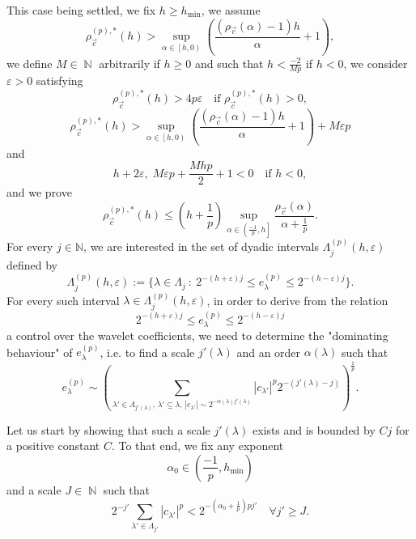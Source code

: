 \documentclass[a4paper,11pt,oneside]{article}
\DeclareMathOperator{\N}{\mathbb{N}}
\newcommand{\coint}[1]{\left[{#1}\right)}
\newcommand{\ooint}[1]{\left({#1}\right)}
\newcommand{\ocint}[1]{\left({#1}\right]}
\newcommand{\modu}[1]{\left\vert{#1}\right\vert}
\theoremstyle{definition}
\theoremstyle{plain}
\begin{document}
This case being settled, we fix $h\geq h_{\min}$, we assume 
\begin{equation}\label{eq:hyp}
    \rho^{(p),\ast}_{\vec{c}}(h)>\sup_{\alpha\in\coint{h,0}}\left(\frac{(\rho_{\vec{c}}(\alpha)-1)h}{\alpha}+1\right),
\end{equation}
we define $M\in\N$ arbitrarily if $h\geq 0$ and such that $h<\frac{-2}{Mp}$ if $h<0$,
we consider $\varepsilon>0$ satisfying
\begin{equation}\label{eq:epsilon}
    \rho_{\vec{c}}^{(p),\ast}(h)>4p\varepsilon \quad\text{if }\rho_{\vec{c}}^{(p),\ast}(h)>0,
\end{equation}
\begin{equation}\label{eq:epsilon_hyp}
    \rho^{(p),\ast}_{\vec{c}}(h)>\sup_{\alpha\in\coint{h,0}}\left(\frac{(\rho_{\vec{c}}(\alpha)-1)h}{\alpha}+1\right)+M\varepsilon p 
\end{equation}
and
\begin{equation}\label{eq:epsilon_neg}
    h+2\varepsilon ,\; M\varepsilon p +\frac{Mhp}{2}+1<0 \quad\text{if }h<0, 
\end{equation}
and we prove
\begin{equation}\label{eq:thesis_sup}
    \rho_{\vec{c}}^{(p),\ast}(h)\leq\left(h+\frac{1}{p}\right)\sup_{\alpha\in\ocint{\frac{-1}{p},h}}\frac{\rho_{\vec{c}}(\alpha)}{\alpha+\frac{1}{p}}.
\end{equation}
For every $j \in \mathbb{N}$, we are interested in the set of dyadic intervals 
\(\Lambda_j^{(p)}(h,\varepsilon)\) defined by
\[
\Lambda_j^{(p)}(h,\varepsilon) := \bigl\{ \lambda \in \Lambda_j \ : \ 2^{-(h+\varepsilon)j} \leq e_\lambda^{(p)} \leq 2^{-(h-\varepsilon)j} \bigr\}.
\]
For every such interval $\lambda \in \Lambda_j^{(p)}(h,\varepsilon)$, in order to derive from the relation
$$
2^{-(h+\varepsilon)j} \leq e_\lambda^{(p)} \leq 2^{-(h-\varepsilon)j}
$$
 a control over the wavelet coefficients, we need to determine the "dominating behaviour" of $e_\lambda^{(p)}$, i.e. to find a scale $j'(\lambda)$ and an order $\alpha(\lambda)$ such that
\[
e_\lambda^{(p)}\sim \left(\sum_{\lambda'\in\Lambda_{j'(\lambda)},\,\lambda'\subseteq\lambda,\,\modu{c_{\lambda'}}\sim 2^{-\alpha(\lambda)j'(\lambda)}}\modu{c_{\lambda'}}^p2^{-(j'(\lambda)-j)}\right)^{\frac{1}{p}}.
\]

\medskip

Let us start by showing that such a scale $j'(\lambda)$ exists and is bounded by $Cj$ for a positive constant $C$. To that end, we fix any exponent
\[
    \alpha_0 \in \ooint{\frac{-1}{p},h_{\min}}
\]
and a scale $J\in\N$ such that
\begin{equation}\label{sum_max}
2^{-j'}\sum_{\lambda'\in\Lambda_{j'}}\modu{c_{\lambda'}}^p<2^{-\left(\alpha_0+\frac{1}{p}\right)pj'} \quad \forall j' \geq J. 
\end{equation}
\end{document}
